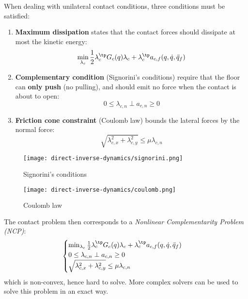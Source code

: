 When dealing with unilateral contact conditions, three conditions must be satisfied:
\begin{enumerate}
    \item \textbf{Maximum dissipation} states that the contact forces should dissipate at most the kinetic energy:
    \begin{equation*}
        \min_{\lambda_c} \frac{1}{2}\lambda_c^\tp G_c(q)\lambda_c + \lambda_c^\tp a_{c, f}(q, \dot{q}, \ddot{q}_f)
    \end{equation*}
    \item \textbf{Complementary condition} (Signorini's conditions) require that the floor can \textbf{only push} (no pulling), and should emit no force when the contact is about to open:
    \begin{equation*}
        0\leq\lambda_{c,n} \perp a_{c,n}\geq 0
    \end{equation*}
    \item \textbf{Friction cone constraint} (Coulomb law) bounds the lateral forces by the normal force:
    \begin{equation*}
        \sqrt{\lambda_{c,x}^2 + \lambda_{c,y}^2} \leq \mu\lambda_{c,n}
    \end{equation*}
\end{enumerate}

\begin{figure}[H]
    \centering
    \begin{minipage}{0.4\textwidth}
        \centering
        \texttt{[image: direct-inverse-dynamics/signorini.png]}
        \caption*{Signorini's conditions}
    \end{minipage}
    \begin{minipage}{0.4\textwidth}
        \centering
        \texttt{[image: direct-inverse-dynamics/coulomb.png]}
        \caption*{Coulomb law}
    \end{minipage}
\end{figure}

The contact problem then corresponds to a \emph{Nonlinear Complementarity Problem (NCP)}:
\begin{equation*}
    \begin{cases}
        \min_{\lambda_c} \frac{1}{2}\lambda_c^\tp G_c(q)\lambda_c + \lambda_c^\tp a_{c, f}(q, \dot{q}, \ddot{q}_f) \\
        0\leq\lambda_{c,n} \perp a_{c,n}\geq 0 \\
        \sqrt{\lambda_{c,x}^2 + \lambda_{c,y}^2} \leq \mu\lambda_{c,n}
    \end{cases}
\end{equation*}
which is non-convex, hence hard to solve. More complex solvers can be used to solve this problem in an exact way.

